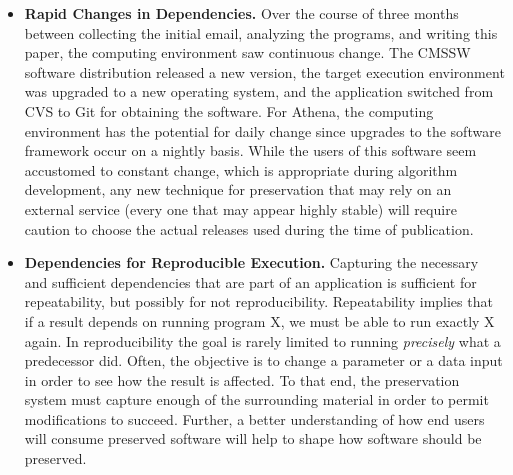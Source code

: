 \begin{itemize}
\item {\bf Rapid Changes in Dependencies.}  
Over the course of three months between collecting the initial email, analyzing the programs, and writing this paper, the computing environment saw continuous change. The CMSSW software distribution released a new version, the target execution environment was upgraded to a new operating system, and the application switched from CVS to Git for obtaining the software. For Athena, the computing environment has the potential for daily change since upgrades to the software framework occur on a nightly basis. While the users of this software seem accustomed to constant change, which is appropriate during algorithm development, any new technique for preservation that may rely on an external service (every one that may appear highly stable) will require caution to choose the actual releases used during the time of publication.

\item {\bf Dependencies for Reproducible Execution.} Capturing the necessary and sufficient dependencies that are part of an application is sufficient for repeatability, but possibly for not reproducibility.
Repeatability implies that if a result depends on running program X, we must be able to run exactly X again. In reproducibility the goal is rarely limited to running
\emph{precisely} what a predecessor did. Often, the objective is to
change a parameter or a data input in order to see how the result is affected. To that end, the preservation system must capture enough of the surrounding
material in order to permit modifications to succeed. 
Further, a better understanding of how end users will consume preserved software will help to shape how
software should be preserved.
\end{itemize}

